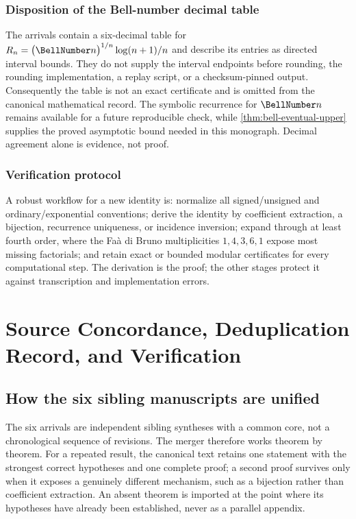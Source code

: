 \documentclass[11pt,a4paper,oneside,openany]{book}
\theoremstyle{definition}
\theoremstyle{remark}
\begin{document}
\section{Disposition of the Bell-number decimal table}

The arrivals contain a six-decimal table for
$R_n=\bigl(\BellNumber n\bigr)^{1/n}\log(n+1)/n$ and describe its entries as directed
interval bounds.  They do not supply the interval endpoints before rounding,
the rounding implementation, a replay script, or a checksum-pinned output.
Consequently the table is not an exact certificate and is omitted from the
canonical mathematical record.  The symbolic recurrence for $\BellNumber n$ remains
available for a future reproducible check, while
\cref{thm:bell-eventual-upper} supplies the proved asymptotic bound needed in
this monograph.  Decimal agreement alone is evidence, not proof.

\section{Verification protocol}

A robust workflow for a new identity is: normalize all signed/unsigned and
ordinary/exponential conventions; derive the identity by coefficient
extraction, a bijection, recurrence uniqueness, or incidence inversion;
expand through at least fourth order, where the Faà di Bruno multiplicities
$1,4,3,6,1$ expose most missing factorials; and retain exact or bounded modular
certificates for every computational step.  The derivation is the proof; the
other stages protect it against transcription and implementation errors.

\part{Source Concordance, Deduplication Record, and Verification}

\chapter{How the six sibling manuscripts are unified}
\label{ch:merged-concordance}

The six arrivals are independent sibling syntheses with a common core, not a
chronological sequence of revisions.  The merger therefore works theorem by
theorem.  For a repeated result, the canonical text retains one statement with the
strongest correct hypotheses and one complete proof; a second proof survives only
when it exposes a genuinely different mechanism, such as a bijection rather than
coefficient extraction.  An absent theorem is imported at the point where its
hypotheses have already been established, never as a parallel appendix.
\end{document}
